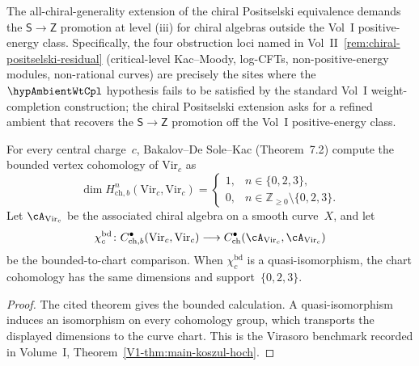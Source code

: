 \begin{remark}
\label{rem:cp4-via-stage-stratification}
The all-chiral-generality extension of the chiral Positselski
equivalence demands the $\mathsf{S} \to
\mathsf{Z}$ promotion at level (iii) for chiral algebras outside
the Vol~I positive-energy class. Specifically, the four obstruction
loci named in
Vol~II~\cref{rem:chiral-positselski-residual} (critical-level
Kac--Moody, log-CFTs, non-positive-energy modules,
non-rational curves) are precisely the sites where the
$\hypAmbientWtCpl$ hypothesis fails to be satisfied by the
standard Vol~I weight-completion construction; the chiral Positselski
extension asks for a refined ambient that recovers the
$\mathsf{S} \to \mathsf{Z}$ promotion off the Vol~I positive-energy
class.
\end{remark}

\begin{theorem}
\label{thm:chirhoch-virasoro-concentration}%
%
%
For every central charge~$c$, Bakalov--De Sole--Kac
\cite{BDSK21} \textup{(}Theorem~7.2\textup{)} compute the
bounded vertex cohomology of $\mathrm{Vir}_c$ as
\[
 \dim H^n_{\mathrm{ch},b}(\mathrm{Vir}_c,\mathrm{Vir}_c)
 =
 \begin{cases}
 1,&n\in\{0,2,3\},\\
 0,&n\in\mathbb Z_{\geq0}\setminus\{0,2,3\}.
 \end{cases}
\]
Let $\cA_{\mathrm{Vir}_c}$ be the associated chiral algebra on a
smooth curve~$X$, and let
\[
 \chi_c^{\mathrm{bd}}\colon
 C^\bullet_{\mathrm{ch},b}(\mathrm{Vir}_c,\mathrm{Vir}_c)
 \longrightarrow
 C^\bullet_{\mathrm{ch}}(\cA_{\mathrm{Vir}_c},
                         \cA_{\mathrm{Vir}_c})
\]
be the bounded-to-chart comparison.  When $\chi_c^{\mathrm{bd}}$ is a
quasi-isomorphism, the chart cohomology has the same dimensions and
support~$\{0,2,3\}$.
\end{theorem}

\begin{proof}
The cited theorem gives the bounded calculation. A quasi-isomorphism
induces an isomorphism on every
cohomology group, which transports the displayed dimensions to the
curve chart.  This is the Virasoro benchmark recorded in Volume~I,
Theorem~\ref*{V1-thm:main-koszul-hoch}.
\end{proof}


